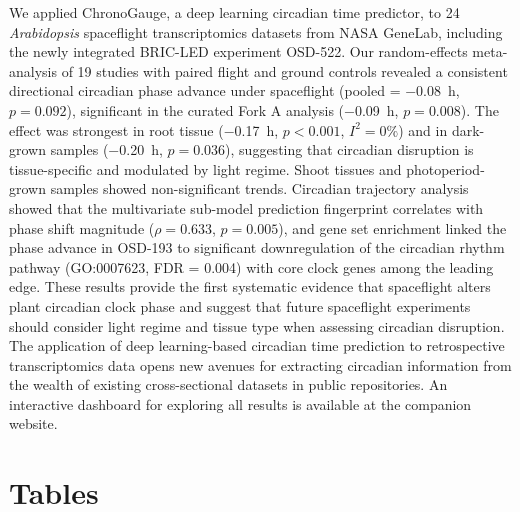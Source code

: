 \documentclass[11pt,a4paper]{article}
\begin{document}
We applied ChronoGauge, a deep learning circadian time predictor, to 24 \textit{Arabidopsis} spaceflight transcriptomics datasets from NASA GeneLab, including the newly integrated BRIC-LED experiment OSD-522. Our random-effects meta-analysis of 19 studies with paired flight and ground controls revealed a consistent directional circadian phase advance under spaceflight (pooled = $-$0.08~h, $p = 0.092$), significant in the curated Fork A analysis ($-$0.09~h, $p = 0.008$). The effect was strongest in root tissue ($-$0.17~h, $p < 0.001$, $I^2 = 0\%$) and in dark-grown samples ($-$0.20~h, $p = 0.036$), suggesting that circadian disruption is tissue-specific and modulated by light regime. Shoot tissues and photoperiod-grown samples showed non-significant trends. Circadian trajectory analysis showed that the multivariate sub-model prediction fingerprint correlates with phase shift magnitude ($\rho = 0.633$, $p = 0.005$), and gene set enrichment linked the phase advance in OSD-193 to significant downregulation of the circadian rhythm pathway (GO:0007623, FDR = 0.004) with core clock genes among the leading edge. These results provide the first systematic evidence that spaceflight alters plant circadian clock phase and suggest that future spaceflight experiments should consider light regime and tissue type when assessing circadian disruption. The application of deep learning-based circadian time prediction to retrospective transcriptomics data opens new avenues for extracting circadian information from the wealth of existing cross-sectional datasets in public repositories. An interactive dashboard for exploring all results is available at the companion website.

\section*{Tables}
\end{document}
